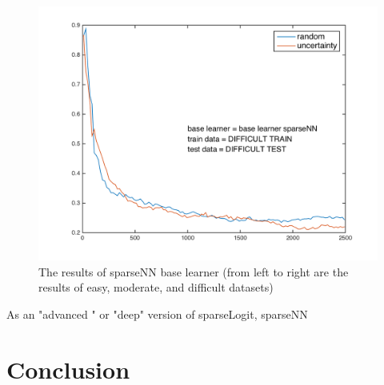 \documentclass{article}
\begin{document}
\begin{figure}[!ht]
\begin{minipage}{.31\textwidth}
      \includegraphics[width=1\linewidth]{../sparseNN_difficult}
    \end{minipage}
    \caption{The results of sparseNN base learner (from left to right are the results of easy, moderate, and difficult datasets)}
    \label{fig:sparseNN}
  \end{figure}
As an "advanced " or "deep" version of sparseLogit, sparseNN 

\section{Conclusion}

{}

\end{document}
